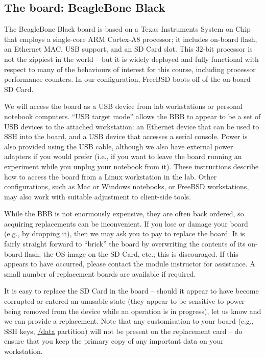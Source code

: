 \documentclass[a4paper,10pt]{article}
\begin{document}
\subsection*{The board: BeagleBone Black}

The BeagleBone Black board is based on a Texas Instruments System on Chip that
employs a single-core ARM Cortex-A8 processor; it includes on-board flash, an
Ethernet MAC, USB support, and an SD Card slot.
This 32-bit processor is not the zippiest in the world -- but it is widely
deployed and fully functional with respect to many of the behaviours of
interest for this course, including processor performance counters.
In our configuration, FreeBSD boots off of the on-board SD Card.

We will access the board as a USB device from lab workstations or personal
notebook computers.
``USB target mode'' allows the BBB to appear to be a set of USB devices to the
attached workstation: an Ethernet device that can be used to SSH into the
board, and a USB device that accesses a serial console.
Power is also provided using the USB cable, although we also have external
power adapters if you would prefer (i.e., if you want to leave the board
running an experiment while you unplug your notebook from it).
These instructions describe how to access the board from a Linux workstation
in the lab.
Other configurations, such as Mac or Windows notebooks, or FreeBSD
workstations, may also work with suitable adjustment to client-side tools.

While the BBB is not enormously expensive, they are often back ordered, so
acquiring replacements can be inconvenient.
If you lose or damage your board (e.g., by dropping it), then we may ask you
to pay to replace the board.
It is fairly straight forward to ``brick'' the board by overwriting the
contents of its on-board flash, the OS image on the SD Card, etc.; this is
discouraged.
If this appears to have occurred, please contact the module instructor for
assistance.
A small number of replacement boards are available if required.

It is easy to replace the SD Card in the board -- should it appear to have
become corrupted or entered an unusable state (they appear to be sensitive to
power being removed from the device while an operation is in progress), let us
know and we can provide a replacement.
Note that any customisation to your board (e.g., SSH keys, \url{/data}
partition) will not be present on the replacement card -- do ensure that you
keep the primary copy of any important data on your workstation.
\end{document}
